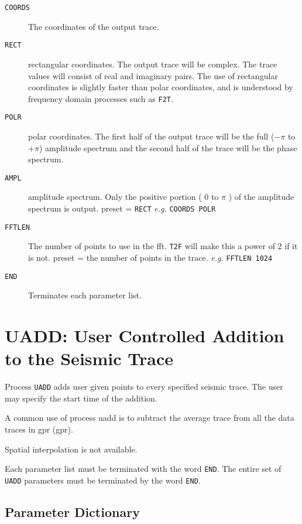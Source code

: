 \begin{description}
\item[\texttt{COORDS}] The coordinates of the output trace.
\item[\texttt{RECT}] rectangular coordinates.  The output trace will be complex.
         The trace values will consist of real and imaginary pairs.  The
         use of rectangular coordinates is slightly faster than polar
         coordinates, and is understood by frequency domain processes
         such as \texttt{F2T}.
\item[\texttt{POLR}] polar coordinates.  The first half of the output trace
         will be the full ($-\pi$ to $+\pi$) amplitude spectrum and the second
         half of the trace will be the phase spectrum.
\item[\texttt{AMPL}] amplitude spectrum.  Only the positive portion ( 0 to $\pi$ )
         of the amplitude spectrum is output.
         \Gls{preset} = \texttt{RECT}   \textit{e.g.}  \texttt{COORDS POLR}

\item[\texttt{FFTLEN}] The number of points to use in the \gls{fft}.  \texttt{T2F} will make this a
         power of 2 if it is not.
         \Gls{preset} = the number of points in the trace.  \textit{e.g.} \texttt{FFTLEN 1024}

\item[\texttt{END}] Terminates each parameter list.
\end{description}

\section{UADD: User Controlled Addition to the Seismic Trace}
\label{cmd_uadd}

Process \texttt{\texttt{UADD}} adds user given points to every specified seismic trace.
The user may specify the start time of the addition.

A common use of process uadd is to subtract the average trace from all
the data traces in \gls{gpr} (\gls{gpr}).

Spatial interpolation is not available.

Each parameter list must be terminated with the word \texttt{END}.  The entire
set of \texttt{UADD} parameters must be terminated by the word \texttt{END}.

\subsection{Parameter Dictionary}

